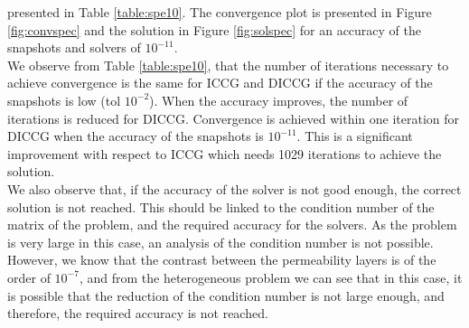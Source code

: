 \documentclass{ecmorXV}
\begin{document}
presented in Table \ref{table:spe10}. 
The convergence plot is presented in Figure \ref{fig:convspec} and the solution in Figure \ref{fig:solspec} for 
an accuracy of the snapshots and solvers of $10^{-11}$.\\
We observe from Table \ref{table:spe10}, that the number of iterations necessary to achieve convergence
is the same for ICCG and DICCG if the accuracy of the snapshots is low (tol $10^{-2}$). When the 
accuracy improves, the number of iterations is reduced for DICCG. 
Convergence is achieved within one iteration for DICCG when the accuracy of the snapshots is $10^{-11}$. 
This is a significant improvement with respect to ICCG which needs 1029 iterations to achieve the solution.\\
We also observe that, if the accuracy of the solver is not good enough, the correct solution is not reached.
This should be linked to the condition number of the matrix of the problem, and the required accuracy for the solvers. 
As the problem is very large in this case, an analysis of the condition number is not possible. However,
we know that the contrast between the permeability layers is of the order of $10^{-7}$, and from the heterogeneous
problem we can see that in this case, it is possible that the reduction of the condition number is not large enough, 
and therefore, the required accuracy is not reached. \\ 
\end{document}
